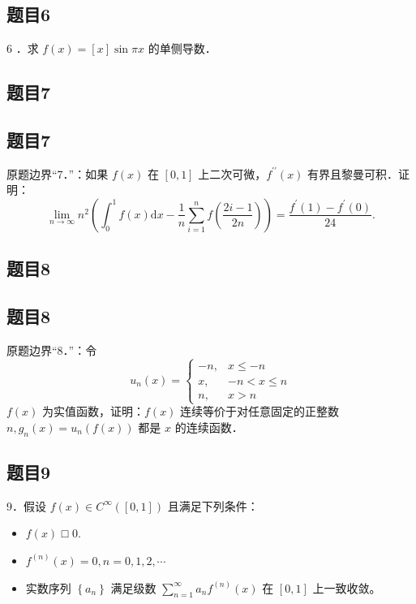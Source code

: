 \documentclass{article}
\begin{document}
\subsection{题目6}
6 ．求 \(f(x)=[x] \sin \pi x\) 的单侧导数．

\begin{itemize}

\subsection{题目7}
\end{itemize}

\subsection{题目7}
原题边界“7．”：如果 \(f(x)\) 在 \([0,1]\) 上二次可微，\(f^{\prime \prime}(x)\) 有界且黎曼可积．证明：
\[
\lim _{n \rightarrow \infty} n^{2}\left(\int_{0}^{1} f(x) \mathrm{d} x-\frac{1}{n} \sum_{i=1}^{n} f\left(\frac{2 i-1}{2 n}\right)\right)=\frac{f^{\prime}(1)-f^{\prime}(0)}{24} .
\]

\subsection{题目8}

\subsection{题目8}
原题边界“8．”：令
\[
u_{n}(x)= \begin{cases}-n, & x \leq-n \\ x, & -n<x \leq n \\ n, & x>n\end{cases}
\]
\(f(x)\) 为实值函数，证明：\(f(x)\) 连续等价于对任意固定的正整数 \(n, g_{n}(x)=u_{n}(f(x))\) 都是 \(x\) 的连续函数．

\subsection{题目9}
9．假设 \(f(x) \in C^{\infty}([0,1])\) 且满足下列条件：

\begin{itemize}
  \item[（1）] \(f(x)\) □ 0.
  \item[（2）] \(f^{(n)}(x)=0, n=0,1,2, \cdots\)
  \item[（3）] 实数序列 \(\left\{a_{n}\right\}\) 满足级数 \(\sum_{n=1}^{\infty} a_{n} f^{(n)}(x)\) 在 \([0,1]\) 上一致收敛。
\end{itemize}
\end{document}

